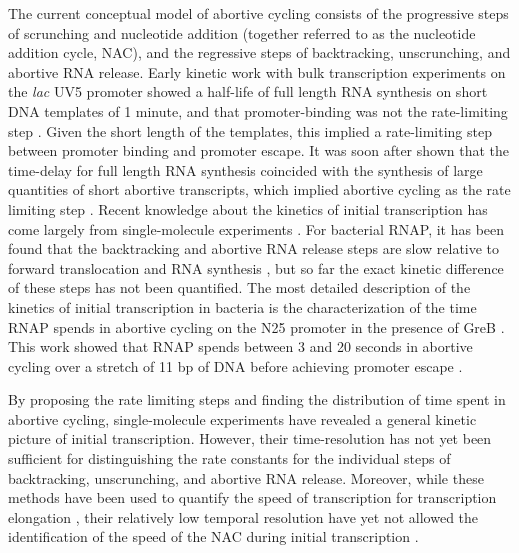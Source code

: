 The current conceptual model of abortive cycling consists of the progressive
steps of scrunching and nucleotide addition (together referred to as the
nucleotide addition cycle, NAC), and the regressive steps of backtracking,
unscrunching, and abortive RNA release. Early kinetic work with bulk
transcription experiments on the \textit{lac} UV5 promoter showed a half-life
of full length RNA synthesis on short DNA templates of 1 minute, and that
promoter-binding was not the rate-limiting step \cite{stefano_lac_1979}. Given
the short length of the templates, this implied a rate-limiting step between
promoter binding and promoter escape. It was soon after shown that the
time-delay for full length RNA synthesis coincided with the synthesis of large
quantities of short abortive transcripts, which implied abortive cycling as
the rate limiting step \cite{munson_abortive_1981}. Recent knowledge about the
kinetics of initial transcription has come largely from single-molecule
experiments \cite{revyakin_abortive_2006, kapanidis_initial_2006,
tang_real-time_2009, kapanidis_retention_2005, margeat_direct_2006}. For
bacterial RNAP, it has been found that the backtracking and abortive RNA
release steps are slow relative to forward translocation and RNA synthesis
\cite{revyakin_abortive_2006, margeat_direct_2006}, but so far the exact
kinetic difference of these steps has not been quantified. The most detailed
description of the kinetics of initial transcription in bacteria is the
characterization of the time RNAP spends in abortive cycling on the N25
promoter in the presence of GreB \cite{revyakin_abortive_2006}. This work
showed that RNAP spends between 3 and 20 seconds in abortive cycling over a
stretch of 11 bp of DNA before achieving promoter escape
\cite{revyakin_abortive_2006}.

By proposing the rate limiting steps and finding the distribution of time
spent in abortive cycling, single-molecule experiments have revealed a general
kinetic picture of initial transcription. However, their time-resolution has
not yet been sufficient for distinguishing the rate constants for the
individual steps of backtracking, unscrunching, and abortive RNA release. Moreover,
while these methods have been used to quantify the speed of transcription for
transcription elongation \cite{wang_force_1998,
tolic-norrelykke_diversity_2004}, their relatively low temporal resolution
have yet not allowed the identification of the speed of the NAC during initial
transcription \cite{revyakin_abortive_2006, margeat_direct_2006}.

